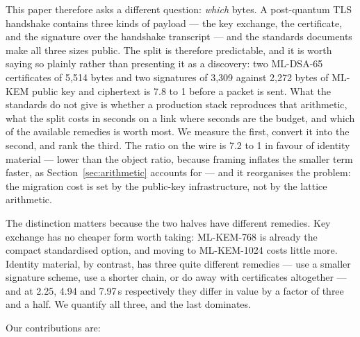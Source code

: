 \documentclass[drones,article,submit,pdftex,moreauthors]{Definitions/mdpi}
\newcommand{\mlkem}{ML-KEM}
\newcommand{\mldsa}{ML-DSA}
\newcommand{\tls}{TLS}
\begin{document}
This paper therefore asks a different question: \emph{which} bytes. A
post-quantum \tls{} handshake contains three kinds of payload --- the key
exchange, the certificate, and the signature over the handshake
transcript --- and the standards documents make all three sizes public.
The split is therefore predictable, and it is worth saying so plainly
rather than presenting it as a discovery: two \mldsa{}-65 certificates of
5{,}514 bytes and two signatures of 3{,}309 against 2{,}272 bytes of
\mlkem{} public key and ciphertext is 7.8 to 1 before a packet is sent.
What the standards do not give is whether a production stack reproduces
that arithmetic, what the split costs in seconds on a link where seconds
are the budget, and which of the available remedies is worth most. We
measure the first, convert it into the second, and rank the third. The
ratio on the wire is 7.2 to 1 in favour of identity material --- lower
than the object ratio, because framing inflates the smaller term faster,
as Section~\ref{sec:arithmetic} accounts for --- and it
reorganises the problem: the migration cost is set by the public-key
infrastructure, not by the lattice arithmetic.

The distinction matters because the two halves have different remedies.
Key exchange has no cheaper form worth taking: \mlkem{}-768 is already
the compact standardised option, and moving to \mlkem{}-1024 costs
little more. Identity material, by contrast, has three quite different
remedies --- use a smaller signature scheme, use a shorter chain, or do
away with certificates altogether --- and at 2.25, 4.94 and 7.97\,s
respectively they differ in value by a factor of three and a half. We
quantify all three, and the last dominates.

Our contributions are:
\end{document}
